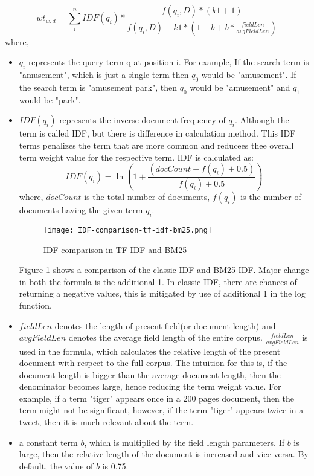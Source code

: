 \begin{equation}
    wt_{w,d} = \sum_{i}^{n}IDF(q_{i}) * \frac{f(q_{i},D)*(k1+1)}{f(q_{i},D)+k1*(1-b+b*\frac{fieldLen}{avgFieldLen})}
\end{equation}
where,
\begin{itemize}
    \item $q_{i}$ represents the query term q at position i.
    For example, If the search term is "amusement", which is just a single term then $q_{0}$ would be "amusement". If the search term is "amusement park", then ${q_{0}}$ would be "amusement" and $q_{1}$ would be "park". 
    \item $IDF(q_{i})$ represents the inverse document frequency of $q_{i}$. Although the term is called IDF, but there is difference in calculation method. This IDF terms penalizes the term that are more common and reducees thee overall term weight value for the respective term. IDF is calculated as:
    \begin{equation}
        IDF(q_{i}) = \ln(1+\frac{(docCount - f(q_{i}) + 0.5)}{f(q_{i}) + 0.5})
    \end{equation}
    where, $docCount$ is the total number of documents,
    $f(q_{i})$ is the number of documents having the given term $q_{i}$. 
    \begin{figure}
        \centering
        \texttt{[image: IDF-comparison-tf-idf-bm25.png]}
        \caption{IDF comparison in TF-IDF and BM25}
        \label{fig:IDF-comparison}
    \end{figure}
    Figure \ref{fig:IDF-comparison} shows a comparison of the classic IDF and BM25 IDF. Major change in both the formula is the additional 1. In classic IDF, there are chances of returning a negative values, this is mitigated by use of additional 1 in the log function.
    \item $fieldLen$ denotes the length of present field(or document length) and $avgFieldLen$ denotes the average field length of the entire corpus. 
    $\frac{fieldLen}{avgFieldLen}$ is used in the formula, which calculates the relative length of the present document with respect to the full corpus. The intuition for this is, if the document length is bigger than the average document length, then the denominator becomes large, hence reducing the term weight value. For example, if a term "tiger" appears once in a 200 pages document, then the term might not be significant, however, if the term "tiger" appears twice in a tweet, then it is much relevant about the term.
    \item a constant term $b$, which is multiplied by the field length parameters. If $b$ is large, then the relative length of the document is increased and vice versa. By default, the value of $b$ is 0.75.

\end{itemize}
